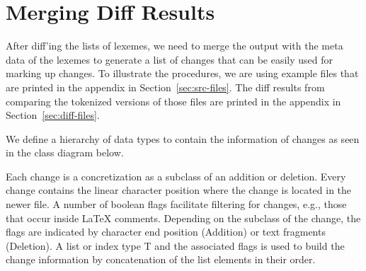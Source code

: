 \section{Merging Diff Results} 

After diff'ing the lists of lexemes, we need to merge the output with the meta data of the lexemes to generate a list of changes that can be easily used for marking up changes.  To illustrate the procedures, we are using example files that are printed in the appendix in Section~\ref{sec:src-files}.  The diff results from comparing the tokenized versions of those files are printed in the appendix in Section~\ref{sec:diff-files}.

We define a hierarchy of data types %
to contain the information of changes as seen in the class diagram below.  


Each change is a concretization as a subclass of an addition or deletion.  Every change contains the linear character position where the change is located in the newer file.  A number of boolean flags facilitate filtering for changes, e.g., those that occur inside LaTeX comments.  Depending on the subclass of the change, the flags are indicated by character end position (Addition) or text fragments (Deletion).  A list or index type T and the associated flags is used to build the change information by concatenation of the list elements in their order.

